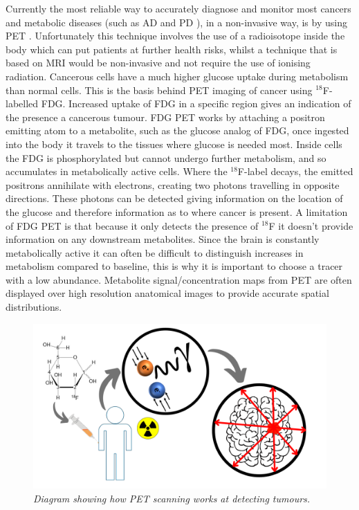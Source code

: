 Currently the most reliable way to accurately diagnose and monitor most cancers and metabolic diseases (such as \ac{AD} \cite{Shokouhi2014ImagingTomography} and \ac{PD} \cite{Meles2017MetabolicDisease}), in a non-invasive way, is by using \ac{PET} \cite{Almuhaideb201118F-FDGOncology}. Unfortunately this technique involves the use of a radioisotope inside the body which can put patients at further health risks, whilst a technique that is based on \ac{MRI} would be non-invasive and not require the use of ionising radiation. Cancerous cells have a much higher glucose uptake during metabolism than normal cells. This is the basis behind \ac{PET} imaging of cancer using $^{18}$F-labelled \ac{FDG}. Increased uptake of \ac{FDG} in a specific region gives an indication of the presence a cancerous tumour. \ac{FDG} \ac{PET} works by attaching a positron emitting atom to a metabolite, such as the glucose analog of \ac{FDG}, once ingested into the body it travels to the tissues where glucose is needed most. Inside cells the \ac{FDG} is phosphorylated but cannot undergo further metabolism, and so accumulates in metabolically active cells. Where the $^{18}$F-label decays, the emitted positrons annihilate with electrons, creating two photons travelling in opposite directions. These photons can be detected giving information on the location of the glucose and therefore information as to where cancer is present. A limitation of \ac{FDG} \ac{PET} is that because it only detects the presence of $^{18}$F it doesn't provide information on any downstream metabolites. Since the brain is constantly metabolically active it can often be difficult to distinguish increases in metabolism compared to baseline, this is why it is important to choose a tracer with a low abundance. Metabolite signal/concentration maps from \ac{PET} are often displayed over high resolution anatomical images to provide accurate spatial distributions.

\begin{figure}
    \centering
    \includegraphics[width=1\textwidth]{Figures/Intro/PET_Scan.png}
    \caption{\textit{Diagram showing how \ac{PET} scanning works at detecting tumours.}}
    \label{fig:intro:PET}
\end{figure}

